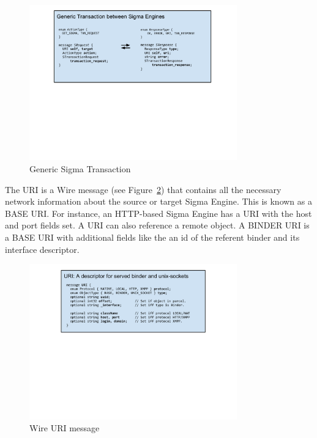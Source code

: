 \documentclass[prodmode]{acmlarge}
\begin{document}
\begin{figure}[h!]
\centering
\includegraphics[width=0.8\textwidth]{drawings/WireTransaction.pdf}
\caption{Generic Sigma Transaction}
\label{fig:GenericSigmaTransaction}
\end{figure}

The URI is a Wire message (see Figure~\ref{fig:WireURI}) that contains all the necessary network information about the source or target Sigma Engine. This is known as a BASE URI. For instance, an HTTP-based Sigma Engine has a URI with the host and port fields set. A URI can also reference a remote object. A BINDER URI is a BASE URI with additional fields like the an id of the referent binder and its interface descriptor.

\begin{figure}[h!]
\centering
\includegraphics[width=0.8\textwidth]{drawings/WireURI.pdf}
\caption{Wire URI message}
\label{fig:WireURI}
\end{figure}
\end{document}
